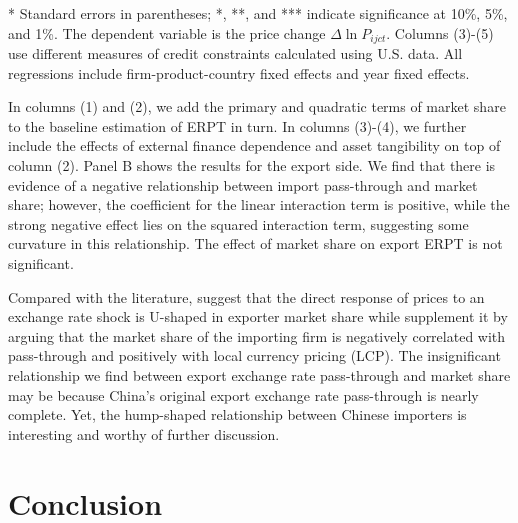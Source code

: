 \documentclass[12pt]{article}
\begin{document}
\begin{table}[htbp]
\begin{threeparttable}
\begin{tabular}{lccccc}
			\bottomrule
		\end{tabular}
		\begin{tablenotes}
			\footnotesize
			\item[*] Standard errors in parentheses; *, **, and *** indicate significance at 10\%, 5\%, and 1\%. The dependent variable is the price change $\Delta \ln P_{ijct}$. Columns (3)-(5) use different measures of credit constraints calculated using U.S. data. All regressions include firm-product-country fixed effects and year fixed effects.
		\end{tablenotes}
	\end{threeparttable}
	\label{tab.share}
\end{table}

In columns (1) and (2), we add the primary and quadratic terms of market share to the baseline estimation of ERPT in turn. In columns (3)-(4), we further include the effects of external finance dependence and asset tangibility on top of column (2). Panel B shows the results for the export side. We find that there is evidence of a negative relationship between import pass-through and market share; however, the coefficient for the linear interaction term is positive, while the strong negative effect lies on the squared interaction term, suggesting some curvature in this relationship. The effect of market share on export ERPT is not significant. 

Compared with the literature, \cite{auer2016} suggest that the direct response of prices to an exchange rate shock is U-shaped in exporter market share while \cite{devereux2017} supplement it by arguing that the market share of the importing firm is negatively correlated with pass-through and positively with local currency pricing (LCP). The insignificant relationship we find between export exchange rate pass-through and market share may be because China's original export exchange rate pass-through is nearly complete. Yet, the hump-shaped relationship between Chinese importers is interesting and worthy of further discussion.

\section{Conclusion}\label{Conclusion}
\end{document}
